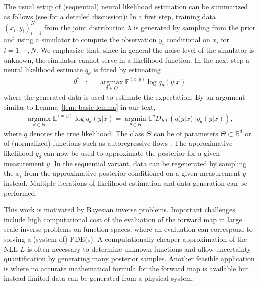 \documentclass{amsart}
\theoremstyle{definition}
\newcommand{\E}{{\mathbb E}}
\newcommand{\R}{{\mathbb R}}
\newcommand{\KL}[2]{D_{KL}\left(#1 || #2\right)}
\newcommand{\argmax}{\operatorname*{argmax}}
\newcommand{\argmin}{\operatorname*{argmin}}
\begin{document}
The usual setup of (sequential) neural likelihood estimation can be summarized as follows (see \cite{papamakarios2019sequantialneural} for a detailed discussion):
In a first step, training data $(x_i, y_i)_{i = 1}^N$ from the joint distribution $\lambda$ is generated by sampling from the prior and using a simulator to compute the observation $y_i$ conditional on $x_i$ for $i = 1, \cdots, N$. We emphasize that, since in general the noise level of the simulator is unknown, the simulator cannot serve in a likelihood function.
In the next step a neural likelihood estimate $q_\theta$ is fitted by estimating
 \begin{eqnarray}\label{eq: opt for neural likelihood}
        \theta^*&:=&\argmax_{\theta \in \Theta} \E^{(x, y)} \log q_\theta(y|x) 
    \end{eqnarray}
where the generated data is used to estimate the expectation. 
By an argument similar to Lemma~\ref{lem: basic lemma} in our text,
\begin{eqnarray*}
    \argmax_{\theta \in \Theta} \E^{(x, y)} \log q_\theta(y|x) = \argmin_{\theta \in \Theta} \E^y\KL{ q(y|x) }{q_\theta(y|x)},
\end{eqnarray*}
where $q$ denotes the true likelihood.
The class $\Theta$ can be of parameters $\Theta \subset \R^d$ or of (normalized) functions such as autoregressive flows \cite{Papamakarios2079Maskedautoregressive}. 
The approximative likelihood $q_\theta$ can now be used to approximate the posterior for a given measurement $y$. In the sequential variant, data can be regenerated by sampling the $x_i$ from the approximative posterior conditioned on a given measurement $y$ instead. Multiple iterations of likelihood estimation and data generation can be performed.


This work is motivated by Bayesian inverse problems.
Important challenges include high computational cost of the evaluation of the forward map in large scale inverse problems on function spaces, where an evaluation can correspond to solving a (system of) PDE(s). A computationally cheaper approximation of the NLL $L$ is often necessary to determine unknown functions and allow uncertainty quantification by generating many posterior samples. 
Another feasible application is where no accurate mathematical formula for the forward map is available but instead limited data can be generated from a physical system. 



\end{document}

